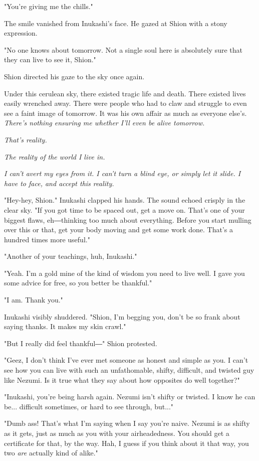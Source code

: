 "You're giving me the chills."

The smile vanished from Inukashi's face. He gazed at Shion with a stony
expression.

"No one knows about tomorrow. Not a single soul here is absolutely sure
that they can live to see it, Shion."

Shion directed his gaze to the sky once again.

Under this cerulean sky, there existed tragic life and death. There
existed lives easily wrenched away. There were people who had to claw
and struggle to even see a faint image of tomorrow. It was his own
affair as much as everyone else's. \emph{There's nothing ensuring me whether
I'll even be alive tomorrow.}

\emph{That's reality.}

\emph{The reality of the world I live in.}

\emph{I can't avert my eyes from it. I can't turn a blind eye, or simply let
it slide. I have to face, and accept this reality.}

"Hey-hey, Shion." Inukashi clapped his hands. The sound echoed crisply
in the clear sky. "If you got time to be spaced out, get a move on.
That's one of your biggest flaws, eh―thinking too much about everything.
Before you start mulling over this or that, get your body moving and get
some work done. That's a hundred times more useful."

"Another of your teachings, huh, Inukashi."

"Yeah. I'm a gold mine of the kind of wisdom you need to live well. I
gave you some advice for free, so you better be thankful."

"I am. Thank you."

Inukashi visibly shuddered. "Shion, I'm begging you, don't be so frank
about saying thanks. It makes my skin crawl."

"But I really did feel thankful―" Shion protested.

"Geez, I don't think I've ever met someone as honest and simple as you.
I can't see how you can live with such an unfathomable, shifty,
difficult, and twisted guy like Nezumi. Is it true what they say about
how opposites do well together?"

"Inukashi, you're being harsh again. Nezumi isn't shifty or twisted. I
know he can be... difficult sometimes, or hard to see through, but..."

"Dumb ass! That's what I'm saying when I say you're naive. Nezumi is as
shifty as it gets, just as much as you with your airheadedness. You
should get a certificate for that, by the way. Hah, I guess if you think
about it that way, you two \emph{are} actually kind of alike."

